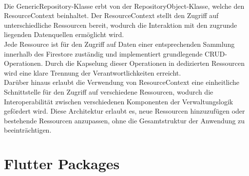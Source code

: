 \\
Die GenericRepository-Klasse erbt von der RepositoryObject-Klasse, welche den ResourceContext beinhaltet. Der ResourceContext stellt den Zugriff auf unterschiedliche Ressourcen bereit, wodurch die Interaktion mit den zugrunde liegenden Datenquellen ermöglicht wird.
\\
Jede Ressource ist für den Zugriff auf Daten einer entsprechenden Sammlung innerhalb des Firestore zuständig und implementiert grundlegende CRUD-Operationen. Durch die Kapselung dieser Operationen in dedizierten Ressourcen wird eine klare Trennung der Verantwortlichkeiten erreicht.
\\
Darüber hinaus erlaubt die Verwendung von ResourceContext eine einheitliche Schnittstelle für den Zugriff auf verschiedene Ressourcen, wodurch die Interoperabilität zwischen verschiedenen Komponenten der Verwaltungslogik gefördert wird. Diese Architektur erlaubt es, neue Ressourcen hinzuzufügen oder bestehende Ressourcen anzupassen, ohne die Gesamtstruktur der Anwendung zu beeinträchtigen.


\section{Flutter Packages}

